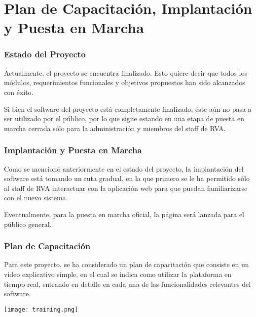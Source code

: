 \chapter{Plan de Capacitación, Implantación y Puesta en Marcha}

\subsection{Estado del Proyecto}
Actualmente, el proyecto se encuentra finalizado. Esto quiere decir que todos los módulos, requerimientos funcionales y objetivos propuestos han sido alcanzados con éxito.

Si bien el software del proyecto está completamente finalizado, éste aún no pasa a ser utilizado por el público, por lo que sigue estando en una etapa de puesta en marcha cerrada sólo para la administración y miembros del staff de RVA.

\subsection{Implantación y Puesta en Marcha}
Como se mencionó anteriormente en el estado del proyecto, la implantación del software está tomando un ruta gradual, en la que primero se le ha permitido sólo al staff de RVA interactuar con la aplicación web para que puedan familiarizarse con el nuevo sistema.

Eventualmente, para la puesta en marcha oficial, la página será lanzada para el público general.

\subsection{Plan de Capacitación}
Para este proyecto, se ha considerado un plan de capacitación que consiste en un video explicativo simple, en el cual se indica como utilizar la plataforma en tiempo real, entrando en detalle en cada una de las funcionalidades relevantes del software.

\texttt{[image: training.png]}
